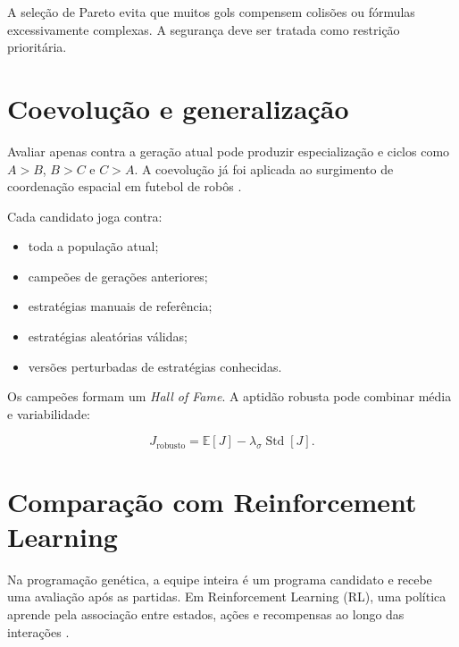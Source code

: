 \documentclass[12pt,a4paper]{article}
\begin{document}
A sele\c{c}\~ao de Pareto evita que muitos gols compensem colis\~oes ou f\'ormulas excessivamente complexas. A seguran\c{c}a deve ser tratada como restri\c{c}\~ao priorit\'aria.

\section{Coevolu\c{c}\~ao e generaliza\c{c}\~ao}

Avaliar apenas contra a gera\c{c}\~ao atual pode produzir especializa\c{c}\~ao e ciclos como $A>B$, $B>C$ e $C>A$. A coevolu\c{c}\~ao j\'a foi aplicada ao surgimento de coordena\c{c}\~ao espacial em futebol de rob\^os \cite{coelho2001}.

Cada candidato joga contra:

\begin{itemize}
  \item toda a popula\c{c}\~ao atual;
  \item campe\~oes de gera\c{c}\~oes anteriores;
  \item estrat\'egias manuais de refer\^encia;
  \item estrat\'egias aleat\'orias v\'alidas;
  \item vers\~oes perturbadas de estrat\'egias conhecidas.
\end{itemize}

Os campe\~oes formam um \textit{Hall of Fame}. A aptid\~ao robusta pode combinar m\'edia e variabilidade:

\begin{equation}
  J_{\mathrm{robusto}}=\mathbb{E}[J]-\lambda_\sigma\operatorname{Std}[J].
\end{equation}

\section{Compara\c{c}\~ao com Reinforcement Learning}

Na programa\c{c}\~ao gen\'etica, a equipe inteira \'e um programa candidato e recebe uma avalia\c{c}\~ao ap\'os as partidas. Em Reinforcement Learning (RL), uma pol\'itica aprende pela associa\c{c}\~ao entre estados, a\c{c}\~oes e recompensas ao longo das intera\c{c}\~oes \cite{sutton2018}.
\end{document}
